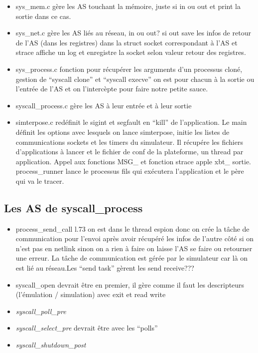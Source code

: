 \documentclass{article}
\begin{document}
\begin{itemize}
\item sys\_mem.c gère les AS touchant la mémoire, juste si in ou out et print la
  sortie dans ce cas.
\item sys\_net.c gère les AS liés au réseau, in ou out? si out save les infos de
  retour de l'AS (dans les registres) dans la struct socket correspondant à l'AS
  et strace affiche un log et enregistre la socket selon valeur retour des
  registres.
\item sys\_process.c fonction pour récupérer les arguments d'un processus cloné,
  gestion de ``syscall clone'' et ``syscall execve'' on est pour chacun à la
  sortie ou l'entrée de l'AS et on l'intercèpte pour faire notre petite sauce.
\item syscall\_process.c gère les AS à leur entrée et à leur sortie
\item simterpose.c redéfinit le sigint et segfault en ``kill'' de
  l'application. Le main définit les options avec lesquels on lance simterpose,
  initie les listes de communications sockets et les timers du simulateur. Il
  récupére les fichiers d'applications à lancer et le fichier de conf de la
  plateforme, {\color{red} un thread par application}. Appel aux fonctions
  MSG\_\* et fonction strace apple xbt\_\* sortie. process\_runner lance le
  processus fils qui exécutera l'application et le père qui va le tracer.
\end{itemize}

\subsection{Les AS de syscall\_process}
  \begin{itemize}
  \item {\color{brown} process\_send\_call} l.73 on est dans le thread espion donc on crée la tâche de communication pour l'envoi après avoir récupéré les infos de l'autre côté si on n'est pas en netlink sinon on a rien à faire on laisse l'AS se faire ou retourner une erreur. La tâche de communication est gérée par le simulateur car là on est lié au réseau.{\color{red}Les ``send task'' gèrent les send receive???}
    \item syscall\_open devrait être en premier, il gère comme il faut les descripteurs (l'émulation / simulation) avec exit et read write
    \item  \textit{syscall\_poll\_pre}
  \item  \textit{syscall\_select\_pre} devrait être avec les ``polls''
  \item  \textit{syscall\_shutdown\_post}
  \end{itemize}
\end{document}
